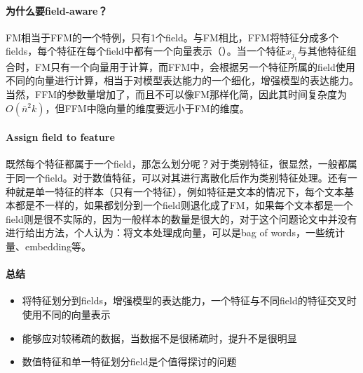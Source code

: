 \paragraph{为什么要field-aware？}
FM相当于FFM的一个特例，只有1个field。与FM相比，FFM将特征分成多个fields，每个特征在每个field中都有一个向量表示（）。当一个特征$x_{j_1}$与其他特征组合时，FM只有一个向量用于计算，而FFM中，会根据另一个特征所属的field使用不同的向量进行计算，相当于对模型表达能力的一个细化，增强模型的表达能力。当然，FFM的参数量增加了，而且不可以像FM那样化简，因此其时间复杂度为$O(\bar{n}^2k)$，但FFM中隐向量的维度要远小于FM的维度。

\paragraph{Assign field to feature}
既然每个特征都属于一个field，那怎么划分呢？对于类别特征，很显然，一般都属于同一个field。对于数值特征，可以对其进行离散化后作为类别特征处理。还有一种就是单一特征的样本（只有一个特征），例如特征是文本的情况下，每个文本基本都是不一样的，如果都划分到一个field则退化成了FM，如果每个文本都是一个field则是很不实际的，因为一般样本的数量是很大的，对于这个问题论文中并没有进行给出方法，个人认为：将文本处理成向量，可以是bag of words，一些统计量、embedding等。

\paragraph{总结}

\begin{itemize}
	\item 将特征划分到fields，增强模型的表达能力，一个特征与不同field的特征交叉时使用不同的向量表示
	\item 能够应对较稀疏的数据，当数据不是很稀疏时，提升不是很明显
	\item 数值特征和单一特征划分field是个值得探讨的问题

\end{itemize}

